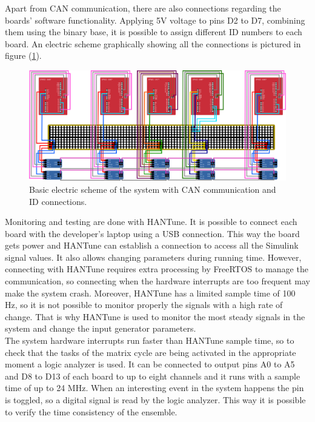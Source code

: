 \documentclass[table,xcdraw]{article}
\begin{document}
Apart from CAN communication, there are also connections regarding the boards' software functionality. Applying 5V voltage to pins D2 to D7, combining them using the binary base, it is possible to assign different ID numbers to each board. An electric scheme graphically showing all the connections is pictured in figure (\ref{fig:electric_scheme}).\\

\begin{figure}[h!]
    \centering
    \includegraphics[width=\textwidth]{figures/methodology/electric_scheme_lowres.png}
    \caption{Basic electric scheme of the system with CAN communication and ID connections.}
    \label{fig:electric_scheme}
\end{figure}

Monitoring and testing are done with HANTune. It is possible to connect each board with the developer's laptop using a USB connection. This way the board gets power and HANTune can establish a connection to access all the Simulink signal values. It also allows changing parameters during running time. However, connecting with HANTune requires extra processing by FreeRTOS to manage the communication, so connecting when the hardware interrupts are too frequent may make the system crash. Moreover, HANTune has a limited sample time of 100 Hz, so it is not possible to monitor properly the signals with a high rate of change. That is why HANTune is used to monitor the most steady signals in the system and change the input generator parameters.\\

The system hardware interrupts run faster than HANTune sample time, so to check that the tasks of the matrix cycle are being activated in the appropriate moment a logic analyzer is used. It can be connected to output pins A0 to A5 and D8 to D13 of each board to up to eight channels and it runs with a sample time of up to 24 MHz. When an interesting event in the system happens the pin is toggled, so a digital signal is read by the logic analyzer. This way it is possible to verify the time consistency of the ensemble.
\end{document}
